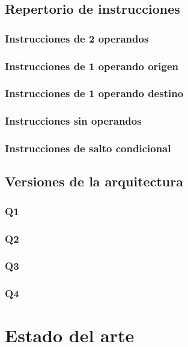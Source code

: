 \subsection{Repertorio de instrucciones}

\subsubsection{Instrucciones de 2 operandos}

\subsubsection{Instrucciones de 1 operando origen}
\subsubsection{Instrucciones de 1 operando destino}
\subsubsection{Instrucciones sin operandos}
\subsubsection{Instrucciones de salto condicional}


\subsection{Versiones de la arquitectura}

\subsubsection{Q1}
\subsubsection{Q2}
\subsubsection{Q3}
\subsubsection{Q4}

\section{Estado del arte}

